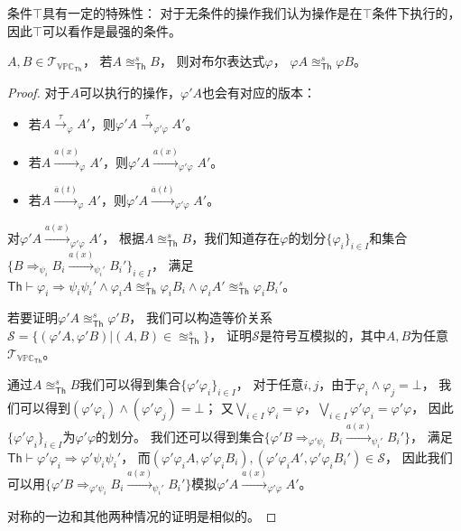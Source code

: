    条件$\top$具有一定的特殊性：
   对于无条件的操作我们认为操作是在$\top$条件下执行的，
   因此$\top$可以看作是最强的条件。
   \begin{corollary}\label{co:condition0}
      $A,B\in \mathcal{T}_{\mathbb{VPC}_{\mathsf{Th}}}$，
      若$A\approxeq_{\mathsf{Th}}^s B$，
      则对布尔表达式$\varphi$，
      $\varphi A\approxeq_{\mathsf{Th}}^s\varphi B$。
   \end{corollary}
   \begin{proof}
      对于$A$可以执行的操作，$\varphi' A$也会有对应的版本：
      \begin{itemize}
         \item 若$A\stackrel{\tau}{\rightarrow}_{\varphi} A'$，则$\varphi' A\stackrel{\tau}{\rightarrow}_{\varphi' \varphi}A'$。
         \item 若$A\stackrel{a(x)}{\rightarrow}_{\varphi} A'$，则$\varphi' A\stackrel{a(x)}{\rightarrow}_{\varphi' \varphi} A'$。
         \item 若$A\stackrel{\overline{a}(t)}{\rightarrow}_{\varphi} A'$，则$\varphi' A\stackrel{\overline{a}(t)}{\rightarrow}_{\varphi' \varphi} A'$。
      \end{itemize}
      对$\varphi' A\stackrel{a(x)}{\rightarrow}_{\varphi'\varphi} A'$，
      根据$A\approxeq_{\mathsf{Th}}^sB$，我们知道存在$\varphi$的划分$\{\varphi_i\}_{i\in I}$和集合$\{B\Rightarrow_{\psi_i}B_i\stackrel{a(x)}{\rightarrow}_{\psi_i'}B_i'\}_{i\in I}$，
      满足$\mathsf{Th}\vdash \varphi_i\Rightarrow \psi_i \psi_i' \wedge \varphi_i A\approxeq_{\mathsf{Th}}^s \varphi_i B_i \wedge \varphi_i A'\approxeq_{\mathsf{Th}}^s \varphi_i B_i'$。
      
      若要证明$\varphi' A\approxeq_{\mathsf{Th}}^s\varphi' B$，
      我们可以构造等价关系$\mathcal{S} = \{(\varphi'A,\varphi'B)|(A,B)\in \approxeq_{\mathsf{Th}}^s\}$，
      证明$\mathcal{S}$是符号互模拟的，其中$A,B$为任意$\mathcal{T}_{\mathbb{VPC}_{\mathsf{Th}}}$。

      通过$A\approxeq_{\mathsf{Th}}^sB$我们可以得到集合$\{\varphi'\varphi_i\}_{i\in I}$，
      对于任意$i,j$，由于$\varphi_i \wedge \varphi_j = \bot$，
      我们可以得到$(\varphi'\varphi_i) \wedge (\varphi'\varphi_j) = \bot$；
      又$\bigvee_{i\in I}\varphi_i = \varphi$，$\bigvee_{i\in I}\varphi'\varphi_i = \varphi'\varphi$，
      因此$\{\varphi'\varphi_i\}_{i\in I}$为$\varphi'\varphi$的划分。
      我们还可以得到集合$\{\varphi'B\Rightarrow_{\varphi'\psi_i}B_i\stackrel{a(x)}{\rightarrow}_{\psi_i'} B_i'\}$，
      满足$\mathsf{Th}\vdash \varphi'\varphi_i\Rightarrow \varphi'\psi_i\psi_i'$，
      而$(\varphi'\varphi_i A, \varphi'\varphi_i B_i),(\varphi'\varphi_i A', \varphi'\varphi_i B_i')\in \mathcal{S}$，
      因此我们可以用$\{\varphi'B\Rightarrow_{\varphi'\psi_i}B_i\stackrel{a(x)}{\rightarrow}_{\psi_i'} B_i'\}$模拟$\varphi' A\stackrel{a(x)}{\rightarrow}_{\varphi'\varphi} A'$。

      对称的一边和其他两种情况的证明是相似的。
   \end{proof}

